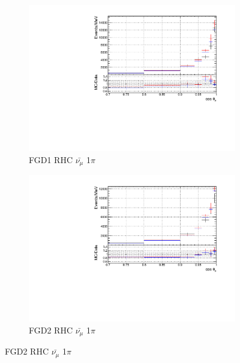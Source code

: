 \begin{figure}[!htbp]
\begin{subfigure}{0.49\textwidth}
  \centering
  \includegraphics[width=\textwidth]{figs/priorpred1D_t_FGD1_anti-numuCC_1pi}
  \caption{FGD1 RHC $\bar{\nu_{\mu}}$ 1$\pi$}
\end{subfigure}
\centering
\begin{subfigure}{0.49\textwidth}
  \centering
  \includegraphics[width=\textwidth]{figs/priorpred1D_t_FGD2_anti-numuCC_1pi}
  \caption{FGD2 RHC $\bar{\nu_{\mu}}$ 1$\pi$}
\end{subfigure}


\end{figure}

